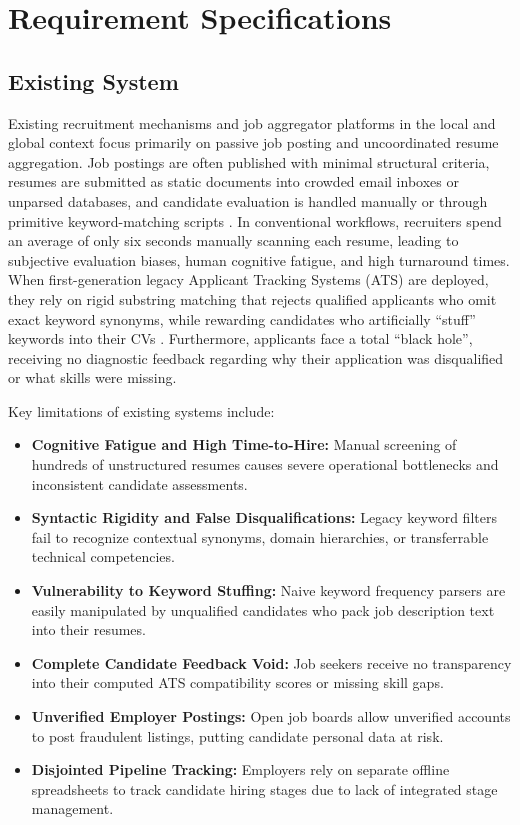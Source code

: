 \chapter{Requirement Specifications} \label{chap:reqs} \label{chap:requirements}

\section{Existing System}
Existing recruitment mechanisms and job aggregator platforms in the local and global context focus primarily on passive job posting and uncoordinated resume aggregation. Job postings are often published with minimal structural criteria, resumes are submitted as static documents into crowded email inboxes or unparsed databases, and candidate evaluation is handled manually or through primitive keyword-matching scripts \cite{parasuraman2021ats}. In conventional workflows, recruiters spend an average of only six seconds manually scanning each resume, leading to subjective evaluation biases, human cognitive fatigue, and high turnaround times. When first-generation legacy Applicant Tracking Systems (ATS) are deployed, they rely on rigid substring matching that rejects qualified applicants who omit exact keyword synonyms, while rewarding candidates who artificially ``stuff'' keywords into their CVs \cite{roy2020resume}. Furthermore, applicants face a total ``black hole'', receiving no diagnostic feedback regarding why their application was disqualified or what skills were missing.

Key limitations of existing systems include:
\begin{itemize}
    \item \textbf{Cognitive Fatigue and High Time-to-Hire:} Manual screening of hundreds of unstructured resumes causes severe operational bottlenecks and inconsistent candidate assessments.
    \item \textbf{Syntactic Rigidity and False Disqualifications:} Legacy keyword filters fail to recognize contextual synonyms, domain hierarchies, or transferrable technical competencies.
    \item \textbf{Vulnerability to Keyword Stuffing:} Naive keyword frequency parsers are easily manipulated by unqualified candidates who pack job description text into their resumes.
    \item \textbf{Complete Candidate Feedback Void:} Job seekers receive no transparency into their computed ATS compatibility scores or missing skill gaps.
    \item \textbf{Unverified Employer Postings:} Open job boards allow unverified accounts to post fraudulent listings, putting candidate personal data at risk.
    \item \textbf{Disjointed Pipeline Tracking:} Employers rely on separate offline spreadsheets to track candidate hiring stages due to lack of integrated stage management.
\end{itemize}

